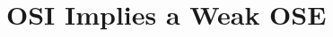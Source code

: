 \documentclass[onefignum,onetabnum]{siamart251216}
\newcommand{\eps}{\varepsilon}
\begin{document}

\section{OSI Implies a Weak OSE}\label{sec:OSI-implies-OSE}
\end{document}
